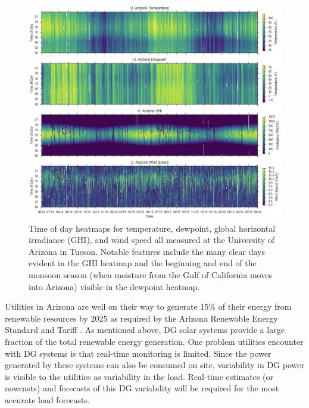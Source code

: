 \begin{figure}[p]
\centering
\includegraphics[width=\textwidth]{figs/ua_heat.png}
\caption[Heatmaps of temperature, dewpoint, irradiance, and wind
speed]{Time of day heatmaps for temperature, dewpoint, global
  horizontal irradiance (GHI), and wind speed all measured at the
  University of Arizona in Tucson. Notable features include the many
  clear days evident in the GHI heatmap and the beginning and end of the
  monsoon season (when moisture from the Gulf of California moves into
  Arizona) visible in the dewpoint heatmap.}
\label{fig:ua_heatmap}
\end{figure}

Utilities in Arizona are well on their way to generate 15\% of their
energy from renewable resources by 2025 as required by the Arizona
Renewable Energy Standard and Tariff \citep{azrest}.
As mentioned above, DG solar systems provide a large fraction of the
total renewable energy generation.
One problem utilities encounter with DG systems is that real-time
monitoring is limited.
Since the power generated by these systems can also be consumed on
site, variability in DG power is visible to the utilities as
variability in the load.
Real-time estimates (or nowcasts) and forecasts of this DG variability
will be required for the most accurate load forecasts.


